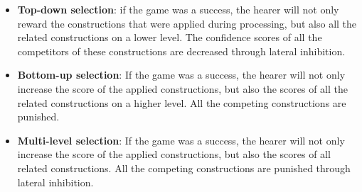 \begin{itemize}
\item {\bfseries Top-down selection}: if the game was a success, the hearer will not only reward the constructions that were applied during processing, but also all the related constructions on a lower level. The confidence scores of all the competitors of these constructions are decreased through lateral inhibition.
\item {\bfseries Bottom-up selection}: If the game was a success, the hearer will not only increase the score of the applied constructions, but also the scores of all the related constructions on a higher level. All the competing constructions are punished.
\item {\bfseries Multi-level selection}: If the game was a success, the hearer will not only increase the score of the applied constructions, but also the scores of all related constructions. All the competing constructions are punished through lateral inhibition.
\end{itemize}

